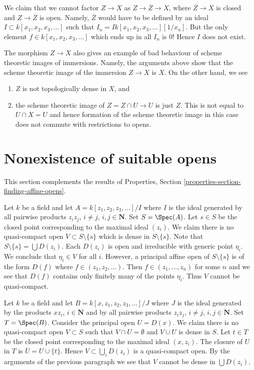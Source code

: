 \medskip\noindent
We claim that we cannot factor $Z \to X$ as
$Z \to \overline{Z} \to X$, where $\overline{Z} \to X$ is closed
and $Z \to \overline{Z}$ is open. Namely, $\overline{Z}$ would
have to be defined by an ideal $I \subset k[x_1, x_2, x_3, \ldots]$
such that $I_n = I k[x_1, x_2, x_3, \ldots][1/x_n]$.
But the only element $f \in k[x_1, x_2, x_3, \ldots]$
which ends up in all $I_n$ is $0$! Hence $I$ does not exist.

\medskip\noindent
The morphism $Z \to X$ also gives an example of bad behaviour
of scheme theoretic images of immersions. Namely, the arguments above
show that the scheme theoretic image of the immersion $Z \to X$ is $X$.
On the other hand, we see
\begin{enumerate}
\item $Z$ is not topologically dense in $X$, and
\item the scheme theoretic image of $Z = Z \cap U \to U$ is just
$Z$. This is not equal to $U \cap X = U$ and hence formation
of the scheme theoretic image in this case
does not commute with restrictions to opens.
\end{enumerate}






\section{Nonexistence of suitable opens}
\label{section-nonexistence-opens}

\noindent
This section complements the results of
Properties, Section \ref{properties-section-finding-affine-opens}.

\medskip\noindent
Let $k$ be a field and let $A = k[z_1, z_2, z_3, \ldots]/I$ where $I$
is the ideal generated by all pairwise products
$z_iz_j$, $i \not = j$, $i, j \in \mathbf{N}$. Set $S = \Spec(A)$.
Let $s \in S$ be the closed point corresponding to the maximal
ideal $(z_i)$. We claim there is no
quasi-compact open $V \subset S \setminus \{s\}$ which is
dense in $S \setminus \{s\}$. Note that $S \setminus \{s\} = \bigcup D(z_i)$.
Each $D(z_i)$ is open and irreducible with generic point
$\eta_i$. We conclude that $\eta_i \in V$ for all $i$.
However, a principal affine open of $S \setminus \{s\}$ is
of the form $D(f)$ where $f \in (z_1, z_2, \ldots)$. Then
$f \in (z_1, \ldots, z_n)$ for some $n$ and we see that $D(f)$ contains
only finitely many of the points $\eta_i$. Thus $V$ cannot be quasi-compact.

\medskip\noindent
Let $k$ be a field and let $B = k[x, z_1, z_2, z_3, \ldots]/J$ where $J$
is the ideal generated by the products $xz_i$, $i \in \mathbf{N}$ and by
all pairwise products $z_iz_j$, $i \not = j$, $i, j \in \mathbf{N}$.
Set $T = \Spec(B)$. Consider the principal open $U = D(x)$.
We claim there is no quasi-compact open $V \subset S$ such that
$V \cap U = \emptyset$ and $V \cup U$ is dense in $S$.
Let $t \in T$ be the closed point corresponding to the maximal
ideal $(x, z_i)$. The closure of $U$ in $T$ is
$\overline{U} = U \cup \{t\}$. Hence $V \subset \bigcup_i D(z_i)$
is a quasi-compact open. By the arguments of the previous paragraph
we see that $V$ cannot be dense in $\bigcup D(z_i)$.

